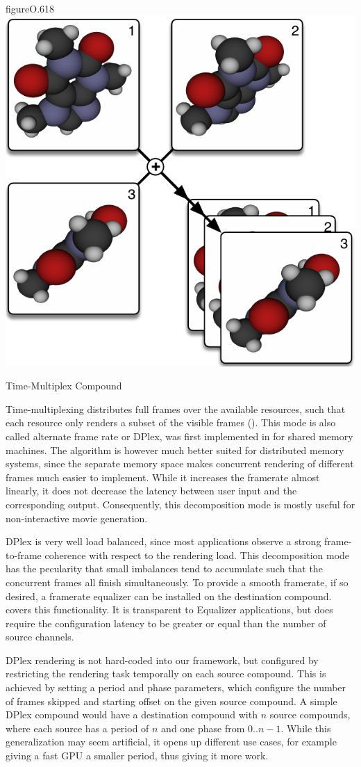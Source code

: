 \begin{wrapfloat}{figure}{O}{.618\textwidth}
\includegraphics[width=.618\textwidth]{images/DPlex}
{\caption{\label{fDPlex}Time-Multiplex Compound}} \end{wrapfloat}

Time-multiplexing distributes full frames over the available resources, such
that each resource only renders a subset of the visible frames ().
This mode is also called alternate frame rate or DPlex, was first implemented in
\cite{BRE:05} for shared memory machines. The algorithm is however much better
suited for distributed memory systems, since the separate memory space makes
concurrent rendering of different frames much easier to implement. While it
increases the framerate almost linearly, it does not decrease the latency
between user input and the corresponding output. Consequently, this
decomposition mode is mostly useful for non-interactive movie generation.

DPlex is very well load balanced, since most applications observe a strong
frame-to-frame coherence with respect to the rendering load. This decomposition
mode has the pecularity that small imbalances tend to accumulate such that the
concurrent frames all finish simultaneously. To provide a smooth framerate, if
so desired, a framerate equalizer can be installed on the destination compound.
 covers this functionality. It is transparent to
\textsf{Equalizer} applications, but does require the configuration latency to
be greater or equal than the number of source channels.

DPlex rendering is not hard-coded into our framework, but configured by
restricting the rendering task temporally on each source compound. This is
achieved by setting a \textsf{period} and \textsf{phase} parameters, which
configure the number of frames skipped and starting offset on the given source
compound. A simple DPlex compound would have a destination compound with $n$
source compounds, where each source has a period of $n$ and one phase from
$0..n-1$. While this generalization may seem artificial, it opens up different
use cases, for example giving a fast GPU a smaller period, thus giving it more
work.

